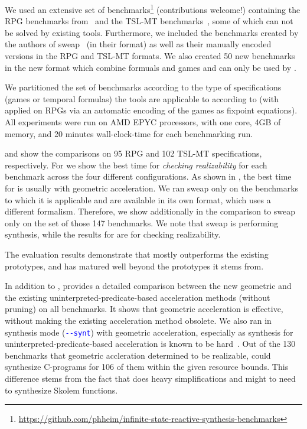 We used an extensive set of benchmarks\footnote{\url{https://github.com/phheim/infinite-state-reactive-synthesis-benchmarks}} (contributions welcome!) containing the RPG benchmarks from~\cite{HeimD24,SchmuckHDN24} and the TSL-MT benchmarks~\cite{MaderbacherB22,HeimD25}, some of which can not be solved by existing tools.
Furthermore, we included the benchmarks created by the authors of sweap~\cite{AzzopardiPSS24} (in their format) as well as their manually encoded versions in the RPG and TSL-MT formats.
We also created 50 new benchmarks in the new \issy{} format which combine formuals and games and can only be used by \issy{}.


We partitioned the set of benchmarks according to the type of specifications (games or temporal formulas) the tools are applicable to  according to  (with \muval{} applied on RPGs via an automatic encoding of the games as fixpoint equations).
All experiments were run on AMD EPYC processors,  with one core, 4GB of memory, and 20 minutes wall-clock-time for each benchmarking run.

 and  show the comparisons on 95 RPG and 102 TSL-MT specifications, respectively.
For \issy{} we show the best time for \emph{checking realizability} for each benchmark across the four different configurations.  As shown in ,  the best time for \issy is usually with geometric acceleration.
We ran sweap only on the benchmarks to which it is applicable and are available in its own format, which uses a different formalism.
Therefore,  we show additionally in   the comparison to sweap only on the set of those 147 benchmarks. 
We note that sweap is performing synthesis, while the results for \issy are for checking realizability.

The evaluation results demonstrate that  \issy{} mostly outperforms the existing prototypes,  and has matured well beyond the prototypes it stems from.

In addition to ,  provides a detailed comparison between the new geometric and the existing uninterpreted-predicate-based acceleration methods (without pruning) on all benchmarks. 
It shows that geometric acceleration is effective, without making the existing  acceleration method obsolete.
We also ran \issy in synthesis mode (\texttt{\textcolor{blue}{-{}-synt}}) with geometric acceleration, especially as synthesis for uninterpreted-predicate-based acceleration is known to be hard~\cite{HeimD24}. 
Out of the 130 benchmarks that geometric accleration  determined to be realizable,  \issy could synthesize C-programs for 106 of them within the given resource bounds.
This difference stems from the fact that \issy does heavy simplifications and might to need to synthesize Skolem functions.

